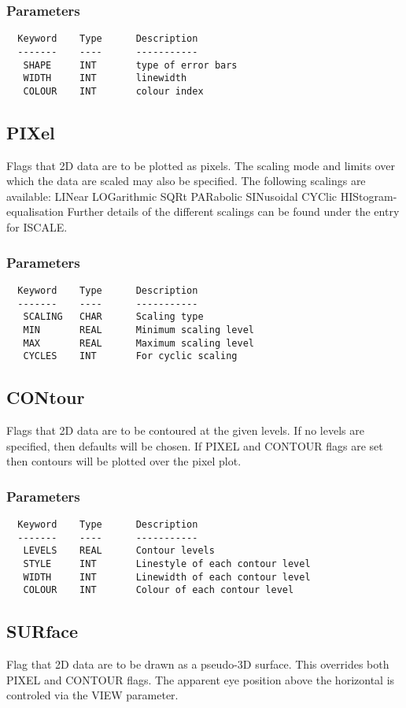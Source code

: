 \documentclass{book}
\renewcommand{\_}{{\tt\char'137}}     %
\begin{document}
\subsubsection{Parameters}
\begin{verbatim}
  Keyword    Type      Description
  -------    ----      -----------
   SHAPE     INT       type of error bars
   WIDTH     INT       linewidth
   COLOUR    INT       colour index
\end{verbatim}\subsection{PIXel}
Flags that 2D data are to be plotted as pixels. The scaling mode
and limits over which the data are scaled may also be specified.
The following scalings are available:
LINear LOGarithmic SQRt PARabolic
SINusoidal CYClic HIStogram-equalisation
Further details of the different scalings can be found under the
entry for ISCALE.
\subsubsection{Parameters}
\begin{verbatim}
  Keyword    Type      Description
  -------    ----      -----------
   SCALING   CHAR      Scaling type
   MIN       REAL      Minimum scaling level
   MAX       REAL      Maximum scaling level
   CYCLES    INT       For cyclic scaling
\end{verbatim}\subsection{CONtour}
Flags that 2D data are to be contoured at the given levels. If
no levels are specified, then defaults will be chosen. If PIXEL
and CONTOUR flags are set then contours will be plotted over
the pixel plot.
 
\subsubsection{Parameters}
\begin{verbatim}
  Keyword    Type      Description
  -------    ----      -----------
   LEVELS    REAL      Contour levels
   STYLE     INT       Linestyle of each contour level
   WIDTH     INT       Linewidth of each contour level
   COLOUR    INT       Colour of each contour level
\end{verbatim}\subsection{SURface}
Flag that 2D data are to be drawn as a pseudo-3D surface. This
overrides both PIXEL and CONTOUR flags. The apparent eye position
above the horizontal is controled via the VIEW parameter.
\end{document}
